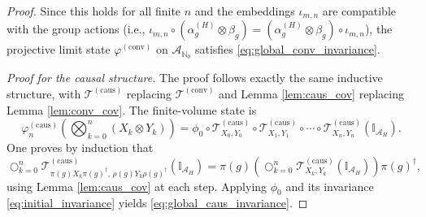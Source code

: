 \documentclass[10pt,a4paper]{amsart}
\begin{document}
\begin{proof}
Since this holds for all finite \(n\) and the embeddings \(\iota_{m,n}\) are compatible with the group actions (i.e., \(\iota_{m,n} \circ (\alpha_g^{(H)} \otimes \beta_g) = (\alpha_g^{(H)} \otimes \beta_g) \circ \iota_{m,n}\)), the projective limit state \(\varphi^{(\text{conv})}\) on \(\mathcal{A}_{\mathbb{N}_0}\) satisfies \eqref{eq:global_conv_invariance}.

\noindent\textit{Proof for the causal structure.} The proof follows exactly the same inductive structure, with \(\mathcal{T}^{(\text{caus})}\) replacing \(\mathcal{T}^{(\text{conv})}\) and Lemma \ref{lem:caus_cov} replacing Lemma \ref{lem:conv_cov}. The finite-volume state is
\[
\varphi_n^{(\text{caus})}\!\left( \bigotimes_{k=0}^n (X_k \otimes Y_k) \right) = \phi_0 \circ \mathcal{T}_{X_0,Y_0}^{(\text{caus})} \circ \mathcal{T}_{X_1,Y_1}^{(\text{caus})} \circ \cdots \circ \mathcal{T}_{X_n,Y_n}^{(\text{caus})}(\mathbb{I}_{\mathcal{A}_H}).
\]
One proves by induction that
\[
\bigcirc_{k=0}^n \mathcal{T}_{\pi(g) X_k \pi(g)^\dagger, \, \rho(g) Y_k \rho(g)^\dagger}^{(\text{caus})}(\mathbb{I}_{\mathcal{A}_H})
= \pi(g) \left( \bigcirc_{k=0}^n \mathcal{T}_{X_k,Y_k}^{(\text{caus})}(\mathbb{I}_{\mathcal{A}_H}) \right) \pi(g)^\dagger,
\]
using Lemma \ref{lem:caus_cov} at each step. Applying \(\phi_0\) and its invariance \eqref{eq:initial_invariance} yields \eqref{eq:global_caus_invariance}.
\end{proof}
\end{document}
